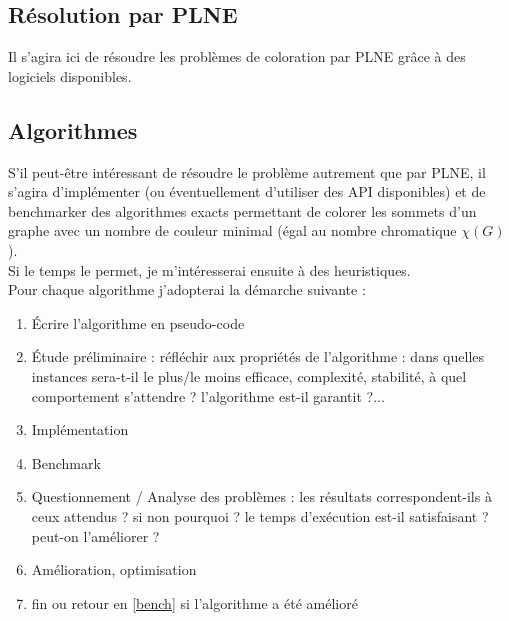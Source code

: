 \subsection{Résolution par PLNE}
Il s'agira ici de résoudre les problèmes de coloration par PLNE grâce à
des logiciels disponibles.


\subsection{Algorithmes}
S'il peut-être intéressant de résoudre le problème autrement que par PLNE,
il s'agira d'implémenter (ou éventuellement d'utiliser des
API disponibles) et de benchmarker des algorithmes exacts permettant
de colorer les sommets d'un graphe avec un nombre de couleur minimal (égal au nombre
chromatique $\chi (G)$).\\
Si le temps le permet, je m'intéresserai ensuite à des heuristiques.\\

Pour chaque algorithme j'adopterai la démarche suivante :
\begin{enumerate}
 \item Écrire l'algorithme en pseudo-code
 \item Étude préliminaire : réfléchir aux propriétés de l'algorithme :
       dans quelles instances sera-t-il
       le plus/le moins efficace, complexité, stabilité, à quel comportement s'attendre ?
       l'algorithme est-il garantit ?...
 \item Implémentation
 \item \label{bench} Benchmark
 \item Questionnement / Analyse des problèmes : les résultats correspondent-ils
       à ceux attendus ? si non pourquoi ?
       le temps d'exécution est-il satisfaisant ? peut-on l'améliorer ?
 \item Amélioration, optimisation
 \item fin ou retour en \ref{bench} si l'algorithme a été amélioré
\end{enumerate}

